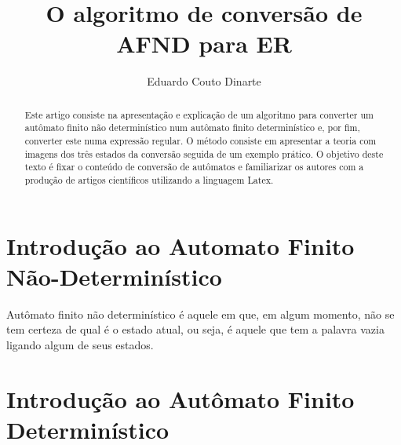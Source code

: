\documentclass[a4paper,10pt]{article} %
\title{O algoritmo de conversão de AFND para ER}
\author{Eduardo Couto Dinarte}
\begin{document}
\maketitle

\begin{abstract}

    Este artigo consiste na apresenta\c{c}\~{a}o e explica\c{c}\~{a}o de um algoritmo para converter um aut\^{o}mato finito n\~{a}o determin\'{i}stico num aut\^{o}mato finito determin\'{i}stico e, por fim, converter este numa express\~{a}o regular. O m\'{e}todo consiste em apresentar a teoria com imagens dos tr\^{e}s estados da convers\~{a}o seguida de um exemplo pr\'{a}tico. O objetivo deste texto \'{e} fixar o conte\'{u}do de convers\~{a}o de aut\^{o}matos e familiarizar os autores com a produ\c{c}\~{a}o de artigos cient\'{i}ficos utilizando a linguagem Latex.

\end{abstract}


\section{Introdução ao Automato Finito Não-Determinístico}

    Aut\^{o}mato finito n\~{a}o determin\'{i}stico \'{e} aquele em que, em algum momento, n\~{a}o se tem certeza de qual \'{e} o estado atual, ou seja, \'{e} aquele que tem a palavra vazia ligando algum de seus estados.

\begin{center}
\end{center}


\section{Introdução ao Autômato Finito Determinístico}
\end{document}
